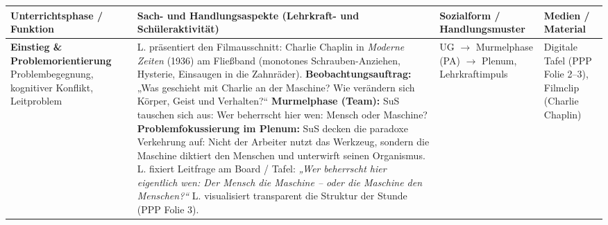 \documentclass[a4paper, fontsize=9pt, landscape]{scrartcl}
\begin{document}
\scriptsize
\noindent
\begin{tabularx}{\textwidth}{|p{3.2cm}|X|p{3.0cm}|p{3.4cm}|}
\hline
\rowcolor{tableGray}
\textbf{\color{primaryBlue}Unterrichtsphase /} \newline \textbf{\color{primaryBlue}Funktion} & 
\textbf{\color{primaryBlue}Sach- und Handlungsaspekte (Lehrkraft- und Schüleraktivität)} & 
\textbf{\color{primaryBlue}Sozialform /} \newline \textbf{\color{primaryBlue}Handlungsmuster} & 
\textbf{\color{primaryBlue}Medien /} \newline \textbf{\color{primaryBlue}Material} \\
\hline

\textbf{Einstieg \&} \newline \textbf{Problemorientierung} \newline
\tiny\color{primaryBlue} Problembegegnung, \newline kognitiver Konflikt, \newline Leitproblem & 
L. präsentiert den Filmausschnitt: Charlie Chaplin in \textit{Moderne Zeiten} (1936) am Fließband (monotones Schrauben-Anziehen, Hysterie, Einsaugen in die Zahnräder). \newline
\textbf{Beobachtungsauftrag:} „Was geschieht mit Charlie an der Maschine? Wie verändern sich Körper, Geist und Verhalten?“ \newline
\textbf{Murmelphase (Team):} SuS tauschen sich aus: Wer beherrscht hier wen: Mensch oder Maschine? \newline
\textbf{Problemfokussierung im Plenum:} SuS decken die paradoxe Verkehrung auf: Nicht der Arbeiter nutzt das Werkzeug, sondern die Maschine diktiert den Menschen und unterwirft seinen Organismus. \newline
L. fixiert Leitfrage am Board / Tafel: \textit{„Wer beherrscht hier eigentlich wen: Der Mensch die Maschine -- oder die Maschine den Menschen?“} \newline
L. visualisiert transparent die Struktur der Stunde (PPP Folie 3). & 
UG $\rightarrow$ \newline
Murmelphase (PA) $\rightarrow$ \newline
Plenum, \newline
Lehrkraftimpuls & 
Digitale Tafel \newline
(PPP Folie 2--3), \newline
Filmclip \newline
(Charlie Chaplin) \\
\hline


\end{tabularx}
\end{document}
